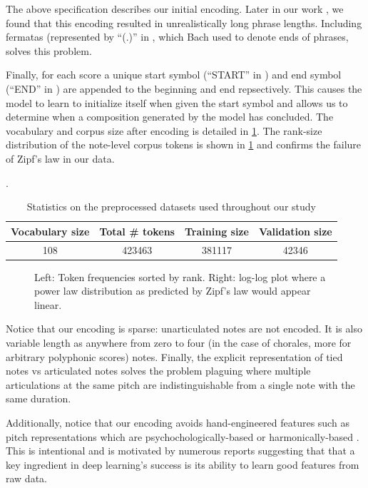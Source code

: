 The above specification describes our initial encoding. Later in our work
, we found that this encoding resulted in unrealistically long
phrase lengths. Including fermatas (represented by ``(.)'' in , which Bach used to denote ends of phrases, solves this problem.

Finally, for each score a unique start symbol (``START'' in )
and end symbol (``END'' in ) are appended to the beginning and
end repsectively. This causes the model to learn to initialize itself when
given the start symbol and allows us to determine when a composition generated
by the model has concluded. The vocabulary and corpus size after encoding is
detailed in \cref{tab:encoded-corpus-stats}. The rank-size distribution of the
note-level corpus tokens is shown in \cref{fig:zipf} and confirms the failure
of Zipf's law in our data.

\begin{table}[tb]
  \centering
  \caption{Statistics on the preprocessed datasets used throughout our study}
  \label{tab:encoded-corpus-stats}.
  \begin{tabular}{c c c c}
    \toprule
    Vocabulary size & Total \# tokens & Training size & Validation size \\
    \midrule
    108 & 423463 & 381117 & 42346 \\
    \bottomrule
  \end{tabular}
\end{table}

\begin{figure}[tb]
  \centering
  
  \caption{Left: Token frequencies sorted by rank. Right: log-log plot where
  a power law distribution as predicted by Zipf's law would appear linear.}
  \label{fig:zipf}
\end{figure}

Notice that our encoding is sparse: unarticulated notes are not encoded. It is
also variable length as anywhere from zero to four (in the case of chorales,
more for arbitrary polyphonic scores) notes. Finally, the explicit
representation of tied notes vs articulated notes solves the problem plaguing
\citep{Eck2002}\citep{eck2008learning} \citep{Liu2014} \citep{Brien2016} where
multiple articulations at the same pitch are indistinguishable from a single
note with the same duration.

Additionally, notice that our encoding avoids hand-engineered features such as
pitch representations which are psychochologically-based \citep{mozer1994neural}
or harmonically-based \citep{franklin2004recurrent}
\citep{laden1989representation}. This is intentional and is motivated by
numerous reports \citep{bengio2009learning}\citep{Bengio2011} suggesting that
that a key ingredient in deep learning's success is its ability to learn good
features from raw data.

